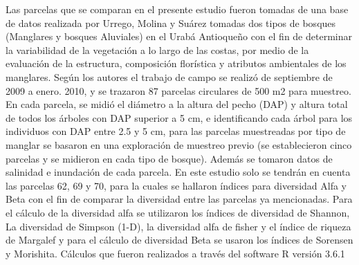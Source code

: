 \documentclass[conference,final,12pt,]{IEEEtran}
\begin{document}
Las parcelas que se comparan en el presente estudio fueron tomadas de
una base de datos realizada por Urrego, Molina y Suárez tomadas dos
tipos de bosques (Manglares y bosques Aluviales) en el Urabá Antioqueño
con el fin de determinar la variabilidad de la vegetación a lo largo de
las costas, por medio de la evaluación de la estructura, composición
florística y atributos ambientales de los manglares. Según los
autores\citep{AB} el trabajo de campo se realizó de septiembre de 2009 a
enero. 2010, y se trazaron 87 parcelas circulares de 500 m2 para
muestreo. En cada parcela, se midió el diámetro a la altura del pecho
(DAP) y altura total de todos los árboles con DAP superior a 5 cm, e
identificando cada árbol para los individuos con DAP entre 2.5 y 5 cm,
para las parcelas muestreadas por tipo de manglar se basaron en una
exploración de muestreo previo (se establecieron cinco parcelas y se
midieron en cada tipo de bosque). Además se tomaron datos de salinidad e
inundación de cada parcela. En este estudio solo se tendrán en cuenta
las parcelas 62, 69 y 70, para la cuales se hallaron índices para
diversidad Alfa y Beta con el fin de comparar la diversidad entre las
parcelas ya mencionadas. Para el cálculo de la diversidad alfa se
utilizaron los índices de diversidad de Shannon, La diversidad de
Simpson (1-D), la diversidad alfa de fisher y el índice de riqueza de
Margalef y para el cálculo de diversidad Beta se usaron los índices de
Sorensen y Morishita. Cálculos que fueron realizados a través del
software R versión 3.6.1
\end{document}
